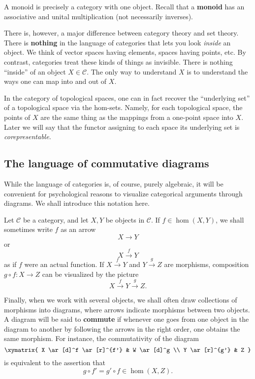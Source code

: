 \begin{example}
A monoid is precisely a category with one object. Recall that a \textbf{monoid}
has an associative and unital multiplication (not necessarily inverses).
\end{example}

There is, however, a major difference between category theory and set theory.
There is \textbf{nothing} in the language of categories that lets you look
\emph{inside} an object. We think of vector spaces having elements, spaces
having points, etc.
By contrast, categories treat these kinds of things as invisible. There
is nothing ``inside'' of an object $X \in \mathcal{C}$. The only way to
understand $X$ is
to understand the ways one can map into and out of $X$.

\begin{example}
In the category of topological spaces, one can in fact recover the
``underlying set'' of a topological space via the hom-sets. Namely, for each
topological space, the points of $X$ are the same thing as the mappings from a
one-point space into $X$. Later we will say that the functor assigning to each
space its underlying set is \emph{corepresentable.}
\end{example}

\subsection{The language of commutative diagrams}

While the language of categories is, of course, purely algebraic, it will be
convenient for psychological reasons to visualize categorical arguments
through diagrams.
We shall introduce this notation here.

Let $\mathcal{C}$ be a category, and let $X, Y$ be objects in $\mathcal{C}$.
If $f \in \hom(X, Y)$, we shall sometimes write $f$ as an arrow
\[ X \to Y  \]
or
\[ X \stackrel{f}{\to} Y \]
as if $f$ were an actual function.
If $X \stackrel{f}{\to} Y$ and $Y \stackrel{g}{\to} Z$ are morphisms,
composition $g \circ f: X \to Z$ can be visualized by the picture
\[ X \stackrel{f}{\to} Y \stackrel{g}{\to} Z.\]

Finally, when we work with several objects, we shall often draw collections of
morphisms into diagrams, where arrows indicate morphisms between two objects.
A diagram will be said to \textbf{commute} if whenever one goes from one
object in the diagram to another by following the arrows in the right order,
one obtains the same morphism.
For instance, the commutativity of the diagram
\[ \xymatrix{
X \ar[d]^f \ar[r]^{f'} &  W \ar[d]^g \\
Y \ar[r]^{g'} &  Z
}\]
is equivalent to the assertion that
\[ g \circ f' = g' \circ f \in \hom(X, Z).  \]


